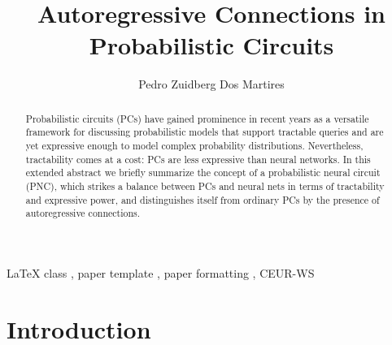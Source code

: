 \documentclass[
]{ceurart}
\begin{document}


\title{Autoregressive Connections in Probabilistic Circuits}



\author{Pedro {Zuidberg Dos Martires}}
\address{Örebro University, Sweden}




\begin{abstract}
	Probabilistic circuits (PCs) have gained prominence in recent years as a versatile framework for discussing probabilistic models that support tractable queries and are yet expressive enough to model complex probability distributions.
	Nevertheless, tractability comes at a cost: PCs are less expressive than neural networks.
	In this extended abstract we briefly summarize the concept of a probabilistic neural circuit (PNC), which strikes a balance between PCs and neural nets in terms of tractability and expressive power, and distinguishes itself from ordinary PCs by the presence of autoregressive connections.
\end{abstract}

\begin{keywords}
	LaTeX class \sep
	paper template \sep
	paper formatting \sep
	CEUR-WS
\end{keywords}

\maketitle




\section{Introduction}
\end{document}
